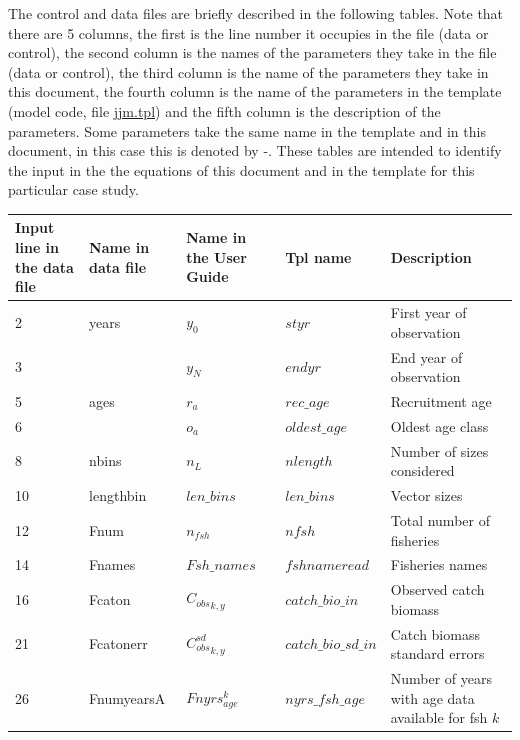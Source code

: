 \documentclass{article}
\begin{document}
The control and data files are briefly described in the following tables. Note that there are 5 columns, the first is the line number it occupies in the file (data or control), the second column is the names of the parameters they take in the file (data or control), the third column is the name of the parameters they take in this document, the fourth column is the name of the parameters in the template (model code, file \href{https://github.com/SPRFMO/jjm/blob/main/src/jjm.tpl}{jjm.tpl}) and the fifth column is the description of the parameters. Some parameters take the same name in the template and in this document, in this case this is denoted by -. These tables are intended to identify the input in the the equations of this document and in the template for this particular case study.


\begin{table}[H]
    \centering
    \begin{tabular}{||  p{0.5cm} | p{1.9cm}  | p{1.9cm} | l | p{7cm} ||}
\hline
Input line in the data file & Name in data file  & Name in the User Guide & Tpl name & Description\\ \hline\hline
2 &    years       & $y_0$             & $styr$ & First year of observation\\ %
3 &                & $y_N$             & $endyr$ & End year of observation\\ \hline
5 &    ages        & $r_a$             & $rec\_age$ & Recruitment age\\ \hline
6 &                &  $o_a$            & $oldest\_age$ & Oldest age class\\ \hline
8 &    nbins       & $n_L$             & $nlength$ & Number of sizes  considered\\ \hline
10 &   lengthbin   & $len\_bins$     & $len\_bins$ & Vector sizes \\  \hline
12 &   Fnum        & $n_{fsh}$         & $nfsh$ & Total number of fisheries\\ \hline
14 &   Fnames      &  $Fsh\_names$       & $fshnameread$ & Fisheries names\\ \hline
16 &   Fcaton      &  ${C_{obs}}_{k,y}$ & $catch\_bio\_in$ & Observed catch biomass\\ \hline
21 &   Fcatonerr   &  ${C^{sd}_{obs}}_{k,y}$               & $catch\_bio\_sd\_in$ & Catch biomass standard errors \\ \hline
26 &   FnumyearsA  & $Fnyrs^k_{age}$   & $nyrs\_fsh\_age$ & Number of years with age data available for fsh $k$\\ \hline

\end{tabular}
\end{table}
\end{document}
